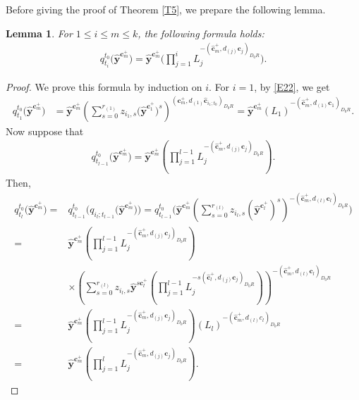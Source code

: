\documentclass[10pt,a4paper]{amsart}
\numberwithin{equation}{section}
\newtheorem{Lemma}[Theorem]{Lemma}
\begin{document}
Before giving the proof of Theorem \ref{T5}, we prepare the following lemma.
\begin{Lemma}\label{L3}
For $1\leq i\leq m\leq k$, the following formula holds:
 \begin{align}\label{eq:q_t-formula}
 q_{t_i}^{t_0}\bigl(\hat{\mathbf{y}}^{\mathbf{c}_{m}^+}\bigr)=\hat{\mathbf{y}}^{\mathbf{c}_{m}^+}
 \Biggl(\prod\limits_{j=1}^{i}L_j^{-(\mathbf{\hat{c}}_{m}^+,d_{(j)}\mathbf{c}_{j})_{D_0R}}\Biggr).
 \end{align}

\end{Lemma}
\begin{proof}
 We prove this formula by induction on $i$.
 For $i=1$, by \eqref{E22}, we get
\begin{align*}
 q_{t_{1}}^{t_0}\bigl(\hat{\mathbf{y}}^{\mathbf{c}_{m}^+}\bigr)&=\hat{\mathbf{y}}^{\mathbf{c}_{m}^+}
 \left(\sum\limits_{s=0}^{r_{(1)}}z_{i_1,s}\bigl(\hat{\mathbf{y}}^{\mathbf{c}_{1}^+}\bigr)^s\right)^{(\mathbf{c}_{m}^+,d_{(1)}\mathbf{\hat{c}}_{i_{1};t_{0}})_{D_0R}}=\hat{\mathbf{y}}^{\mathbf{c}_{m}^+}(L_1)^{-(\mathbf{\hat{c}}_{m}^+,d_{(1)}\mathbf{c}_{1})_{D_0R}}.
\end{align*}
Now suppose that
\begin{align*}
 q_{t_{l-1}}^{t_0}\bigl(\hat{\mathbf{y}}^{\mathbf{c}_{m}^+}\bigr)=\hat{\mathbf{y}}^{\mathbf{c}_{m}^+}
 \left(\prod\limits_{j=1}^{l-1}L_j^{-(\mathbf{\hat{c}}_{m}^+,d_{(j)}\mathbf{c}_{j})_{D_0R}}\right).
\end{align*}
Then,
\begin{align*}
 q_{t_l}^{t_0}\bigl(\hat{\mathbf{y}}^{\mathbf{c}_{m}^+}\bigr)={}&q_{t_{l-1}}^{t_0}\bigl(q_{i_l;t_{l-1}}\bigl(\hat{\mathbf{y}}^{\mathbf{c}_{m}^+}\bigr)\bigr)
 =q_{t_{l-1}}^{t_0}\Biggl(\hat{\mathbf{y}}^{\mathbf{c}_{m}^+}
 \left(\sum\limits_{s=0}^{r_{(l)}}z_{i_l,s}(\hat{\mathbf{y}}^{\mathbf{c}_{l}^+})^s\right)^{-(\mathbf{\hat{c}}_{m}^+,d_{(l)}\mathbf{c}_{l})_{D_0R}}\Biggr)\\
 ={}&\hat{\mathbf{y}}^{\mathbf{c}_{m}^+}\left(\prod\limits_{j=1}^{l-1}L_j^{-(\mathbf{\hat{c}}_{m}^+,d_{(j)}\mathbf{c}_{j})_{D_0R}}\right)\\
&\times\left(\sum\limits_{s=0}^{r_{(l)}}z_{i_l,s}\hat{\mathbf{y}}^{s \mathbf{c}_{l}^+}
\left(\prod\limits_{j=1}^{l-1}L_j^{-s(\mathbf{\hat{c}}_{l}^+,d_{(j)}\mathbf{c}_{j})_{D_0R}}\right)\right)^{-(\mathbf{\hat{c}}_{m}^+,d_{(l)}\mathbf{c}_{l})_{D_0R}}\\
={}&\hat{\mathbf{y}}^{\mathbf{c}_{m}^+}\left(\prod\limits_{j=1}^{l-1}L_j^{-(\mathbf{\hat{c}}_{m}^+,d_{(j)}\mathbf{c}_{j})_{D_0R}}\right)
(L_l)^{-(\mathbf{\hat{c}}_{m}^+,d_{(l)}\mathbf{}c_{l})_{D_0R}}\\
={}&\hat{\mathbf{y}}^{\mathbf{c}_{m}^+}\left(\prod\limits_{j=1}^{l}L_j^{-(\mathbf{\hat{c}}_{m}^+,d_{(j)}\mathbf{c}_{j})_{D_0R}}\right).\tag*{\qed}
\end{align*} \renewcommand{\qed}{}
\end{proof}
\end{document}
